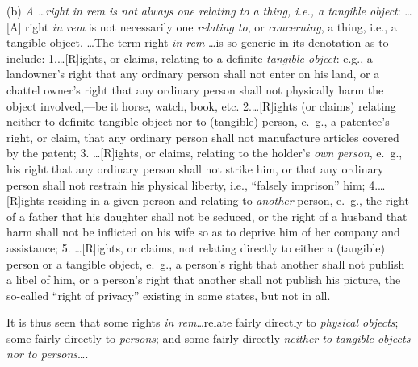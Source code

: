 (b) \textit{A \ldots right in rem is not always one relating to a thing, i.e.,
a tangible object}: \ldots[A] right \textit{in rem} is not necessarily one
\textit{relating to}, or \textit{concerning}, a thing, i.e., a tangible object.
\ldots The term right \textit{in rem} \ldots is so generic in its denotation
as to include: 1.\ldots[R]ights, or claims, relating to a definite
\textit{tangible object}: e.g., a landowner's right that any ordinary person
shall not enter on his land, or a chattel owner's right that any ordinary
person shall not physically harm the object involved,---be  it horse, watch,
book, etc. 2.\ldots[R]ights (or claims) relating neither to definite tangible
object nor to (tangible) person, e.~g., a patentee's right, or claim, that any
ordinary person shall not manufacture articles covered by the patent; 3.
\ldots[R]ights, or claims, relating to the holder's \textit{own person}, e.~g.,
his right that any ordinary person shall not strike him, or that any
ordinary person shall not restrain his physical liberty, i.e., ``falsely
imprison'' him; 4.\ldots[R]ights residing in a given person and relating to
\textit{another} person, e.~g., the right of a father that his daughter shall
not be seduced, or the right of a husband that harm shall not be inflicted on
his wife so as to deprive him of her company and assistance; 5. \ldots[R]ights,
or claims, not relating directly to either a (tangible) person or a tangible
object, e.~g., a person's right that another shall not publish a libel of him,
or a person's right that another shall not publish his picture, the so-called
``right of privacy'' existing in some states, but not in all. 

It is thus seen that some rights \textit{in rem}\ldots relate fairly directly to
\textit{physical objects}; some fairly directly to \textit{persons}; and some
fairly directly \textit{neither to tangible objects nor to persons}\ldots.

